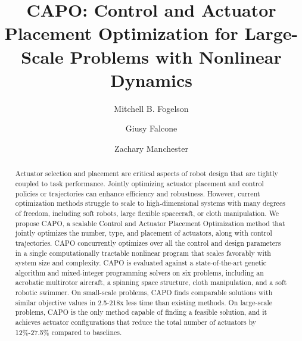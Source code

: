 \documentclass[runningheads]{llncs}
\begin{document}
%
\title{CAPO: Control and Actuator Placement Optimization for Large-Scale Problems with Nonlinear Dynamics}
%
%
\author{Mitchell B. Fogelson %
\and
Giusy Falcone
\and
Zachary Manchester
}
%
%
%
\maketitle              %
%
\begin{abstract}
Actuator selection and placement are critical aspects of robot design that are tightly coupled to task performance. Jointly optimizing actuator placement and control policies or trajectories can enhance efficiency and robustness. However, current optimization methods struggle to scale to high-dimensional systems with many degrees of freedom, including soft robots, large flexible spacecraft, or cloth manipulation.
We propose CAPO, a scalable Control and Actuator Placement Optimization method that jointly optimizes the number, type, and placement of actuators, along with control trajectories. CAPO concurrently optimizes over all the control and design parameters in a single computationally tractable nonlinear program that scales favorably with system size and complexity.
CAPO is evaluated against a state-of-the-art genetic algorithm and mixed-integer programming solvers on six problems, including an acrobatic multirotor aircraft, a spinning space structure, cloth manipulation, and a soft robotic swimmer. On small-scale problems, CAPO finds comparable solutions with similar objective values in 2.5-218x less time than existing methods. On large-scale problems, CAPO is the only method capable of finding a feasible solution, and it achieves actuator configurations that reduce the total number of actuators by 12\%-27.5\% compared to baselines.

\end{abstract}
%
%
%
\end{document}
